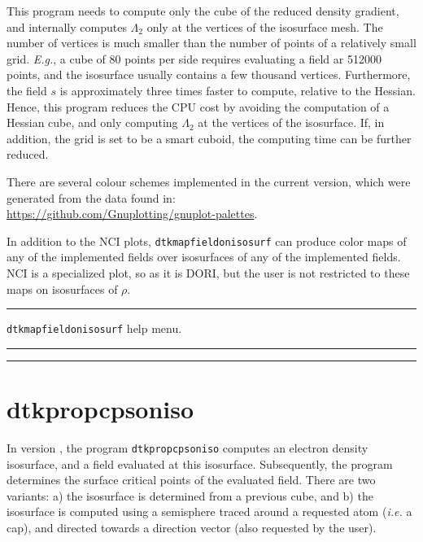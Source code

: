 This program needs to compute only the cube of the reduced density gradient, and internally computes
$\Lambda_2$ only at the vertices of the isosurface mesh. The number of vertices is much smaller
than the number of points of a relatively small grid. \textit{E.g.}, a cube of 80 points per side
requires evaluating a field ar 512000 points, and the isosurface usually contains a few thousand
vertices. Furthermore, the field $s$ is approximately three times faster to compute, relative to
the Hessian. Hence, this program reduces the CPU cost by avoiding the
computation of a Hessian cube, and only computing $\Lambda_2$ at the vertices of the isosurface.
If, in addition, the grid is set to be a \DTK{} smart cuboid, the computing time can be further reduced.

There are several colour schemes implemented in the current version,
which were generated from the data found in:\\
\url{https://github.com/Gnuplotting/gnuplot-palettes}.

In addition to the NCI plots, \texttt{dtkmapfieldonisosurf} can produce color maps of
any of the implemented fields over isosurfaces of any of the implemented fields. NCI is 
a specialized plot, so as it is DORI, but the user is not restricted to these
maps on isosurfaces of $\rho$.


\rule{\textwidth}{1pt}
{\center\texttt{dtkmapfieldonisosurf} help menu.\\}
\rule{\textwidth}{1pt}
\begin{footnotesize}
\end{footnotesize}
\rule{\textwidth}{1pt}

\newpage
\section{\label{sec:dtkpropcpsoniso}dtkpropcpsoniso}

In version \dtkversion, the program \texttt{dtkpropcpsoniso} computes an electron density isosurface,
and a field evaluated at this isosurface. Subsequently, the program determines the surface
critical points of the evaluated field. There are two variants: a) the isosurface is
determined from a previous cube, and b) the isosurface is computed using a semisphere traced
around a requested atom (\textit{i.e.} a cap), and directed towards a direction vector
(also requested by the user).



